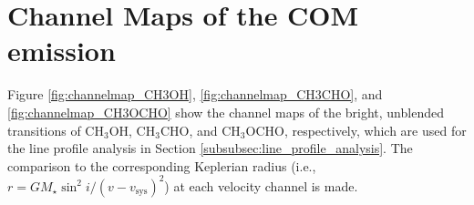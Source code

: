 \documentclass[linenumbers, twocolumn, twocolappendix, astrosymb, times]{aastex631}
\newcommand{\methanol}{CH$_3$OH\xspace}
\newcommand{\acetaldehyde}{CH$_3$CHO\xspace}
\newcommand{\methylformate}{CH$_3$OCHO\xspace}
\begin{document}
\vspace{5mm}





\appendix
\section{Channel Maps of the COM emission}\label{appendix:channel_maps}
Figure \ref{fig:channelmap_CH3OH}, \ref{fig:channelmap_CH3CHO}, and \ref{fig:channelmap_CH3OCHO} show the channel maps of the bright, unblended transitions of \methanol, \acetaldehyde, and \methylformate, respectively, which are used for the line profile analysis in Section \ref{subsubsec:line_profile_analysis}. The comparison to the corresponding Keplerian radius (i.e., $r = GM_\star\sin^2 i / (v - v_\mathrm{sys})^2$) at each velocity channel is made.

\begin{figure*}
\caption{Channel maps of the \methanol $2_{-1,1}$ -- $1_{-1,0}$ E $v_t=0$ transition. The black contours mark the [$-$3, 3, 5, 7, ...]$\,\times\,\sigma$ levels. The dashed contours indicate the negative values. The numbers in the upper-right and upper-left corners indicate the velocity of the channel and its corresponding Keplerian radius ($r = GM_\star\sin^2i/(v - v_\mathrm{sys})^2$), respectively. The red cross in each panel indicate the position of the disk center. The beam is shown in the lower-left corner of the lower-left panel.}
\label{fig:channelmap_CH3OH}
\end{figure*}
\end{document}
